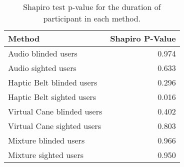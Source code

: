 
\begin{table}[!htb]
\centering
\caption{Shapiro test p-value for the duration of participant in each method.}
\label{tab:shapiro_duration}
\begin{tabular}{lr}
\toprule
                    Method &  Shapiro P-Value \\
\midrule
       Audio blinded users &            0.974 \\
       Audio sighted users &            0.633 \\
 Haptic Belt blinded users &            0.296 \\
 Haptic Belt sighted users &            0.016 \\
Virtual Cane blinded users &            0.402 \\
Virtual Cane sighted users &            0.803 \\
     Mixture blinded users &            0.966 \\
     Mixture sighted users &            0.950 \\
\bottomrule
\end{tabular}
\end{table}

